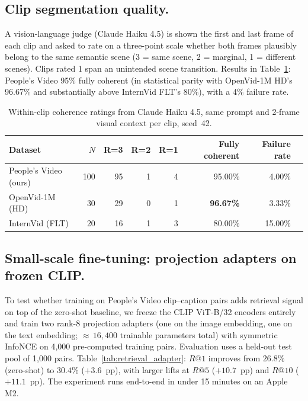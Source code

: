 \documentclass{article}
\begin{document}
\subsection{Clip segmentation quality.}

A vision-language judge (Claude Haiku 4.5) is shown the first and last frame of each clip and asked to rate on a three-point scale whether both frames plausibly belong to the same semantic scene (3 = same scene, 2 = marginal, 1 = different scenes). Clips rated 1 span an unintended scene transition. Results in Table~\ref{tab:clip_coherence}: People's Video 95\% fully coherent (in statistical parity with OpenVid-1M HD's 96.67\% and substantially above InternVid FLT's 80\%), with a 4\% failure rate.

\begin{table}[t]
\centering
\caption{Within-clip coherence ratings from Claude Haiku 4.5, same prompt and 2-frame visual context per clip, seed~42.}
\label{tab:clip_coherence}
\begin{tabular}{lrrrrrrr}
\toprule
Dataset & $N$ & R=3 & R=2 & R=1 & Fully coherent & Failure rate \\
\midrule
People's Video (ours) & 100 & 95 & 1 & 4 & 95.00\%          & \phantom{0}4.00\% \\
OpenVid-1M (HD)       & 30  & 29 & 0 & 1 & \textbf{96.67\%} & \phantom{0}3.33\% \\
InternVid (FLT)       & 20  & 16 & 1 & 3 & 80.00\%          & 15.00\%            \\
\bottomrule
\end{tabular}
\end{table}

\subsection{Small-scale fine-tuning: projection adapters on frozen CLIP.}

To test whether training on People's Video clip--caption pairs adds retrieval signal on top of the zero-shot baseline, we freeze the CLIP ViT-B/32 encoders entirely and train two rank-8 projection adapters (one on the image embedding, one on the text embedding; ${\approx}\,16{,}400$ trainable parameters total) with symmetric InfoNCE on 4{,}000 pre-computed training pairs. Evaluation uses a held-out test pool of 1{,}000 pairs. Table~\ref{tab:retrieval_adapter}: $R@1$ improves from $26.8\%$ (zero-shot) to $30.4\%$ ($+3.6$~pp), with larger lifts at $R@5$ ($+10.7$~pp) and $R@10$ ($+11.1$~pp). The experiment runs end-to-end in under 15 minutes on an Apple M2.
\end{document}
